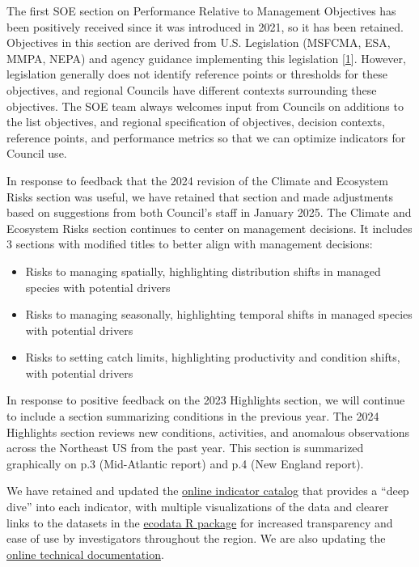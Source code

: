 \documentclass[
  10pt,
]{article}
\providecommand{\tightlist}{%
  \setlength{\itemsep}{0pt}\setlength{\parskip}{0pt}}
\begin{document}
The first SOE section on Performance Relative to Management Objectives
has been positively received since it was introduced in 2021, so it has
been retained. Objectives in this section are derived from U.S.
Legislation (MSFCMA, ESA, MMPA, NEPA) and agency guidance implementing
this legislation
{[}\protect\hyperlink{ref-depiper_operationalizing_2017}{1}{]}. However,
legislation generally does not identify reference points or thresholds
for these objectives, and regional Councils have different contexts
surrounding these objectives. The SOE team always welcomes input from
Councils on additions to the list objectives, and regional specification
of objectives, decision contexts, reference points, and performance
metrics so that we can optimize indicators for Council use.

In response to feedback that the 2024 revision of the Climate and
Ecosystem Risks section was useful, we have retained that section and
made adjustments based on suggestions from both Council's staff in
January 2025. The Climate and Ecosystem Risks section continues to
center on management decisions. It includes 3 sections with modified
titles to better align with management decisions:

\begin{itemize}
\tightlist
\item
  Risks to managing spatially, highlighting distribution shifts in
  managed species with potential drivers
\item
  Risks to managing seasonally, highlighting temporal shifts in managed
  species with potential drivers
\item
  Risks to setting catch limits, highlighting productivity and condition
  shifts, with potential drivers
\end{itemize}

In response to positive feedback on the 2023 Highlights section, we will
continue to include a section summarizing conditions in the previous
year. The 2024 Highlights section reviews new conditions, activities,
and anomalous observations across the Northeast US from the past year.
This section is summarized graphically on p.3 (Mid-Atlantic report) and
p.4 (New England report).

We have retained and updated the
\href{https://noaa-edab.github.io/catalog/index.html}{online indicator
catalog} that provides a ``deep dive'' into each indicator, with
multiple visualizations of the data and clearer links to the datasets in
the \href{https://noaa-edab.github.io/ecodata/}{ecodata R package} for
increased transparency and ease of use by investigators throughout the
region. We are also updating the
\href{https://noaa-edab.github.io/tech-doc/}{online technical
documentation}.
\end{document}
